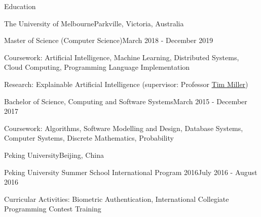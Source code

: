 \documentclass{xsha}
\begin{document}
\address{
\textbf{Phone} +86 136******** $\cdot$\space
\textbf{Email} \href{mailto:luo@jiahai.co}{luo@jiahai.co} $\cdot$\space
\textbf{LinkedIn} \href{https://linkedin.com/in/luojiahai/}{in/luojiahai} $\cdot$\space
\textbf{GitHub} \href{https://github.com/luojiahai/}{luojiahai} $\cdot$\space
\textbf{Site} \href{https://luojiahai.com/}{luojiahai.com}
}

\begin{xsection}{Education}

\begin{xheading}{The University of Melbourne}{Parkville, Victoria, Australia}
\begin{xsubheading}{Master of Science (Computer Science)}{March 2018 - December 2019}
\item Coursework: Artificial Intelligence, Machine Learning, Distributed Systems, Cloud Computing, Programming Language Implementation
\item Research: Explainable Artificial Intelligence (supervisor: Professor \href{https://eecs.uq.edu.au/profile/9477/tim-miller}{Tim Miller})
\end{xsubheading}
\begin{xsubheading}{Bachelor of Science, Computing and Software Systems}{March 2015 - December 2017}
\item Coursework: Algorithms, Software Modelling and Design, Database Systems, Computer Systems, Discrete Mathematics, Probability
\end{xsubheading}
\end{xheading}

\begin{xheading}{Peking University}{Beijing, China}
\begin{xsubheading}{Peking University Summer School International Program 2016}{July 2016 - August 2016}
\item Curricular Activities: Biometric Authentication, International Collegiate Programming Contest Training
\end{xsubheading}
\end{xheading}

\end{xsection}
\end{document}
